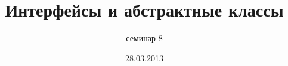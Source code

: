 \documentclass[hyperref={unicode,colorlinks=true,urlbordercolor=blue,linkcolor=blue,urlcolor=blue,pdfborderstyle={/S/U/W 1}}]{beamer}
\title{Интерфейсы и абстрактные классы}
\subtitle{семинар 8}
\date{28.03.2013}
\begin{document}
\frame{\titlepage}


\end{document}
